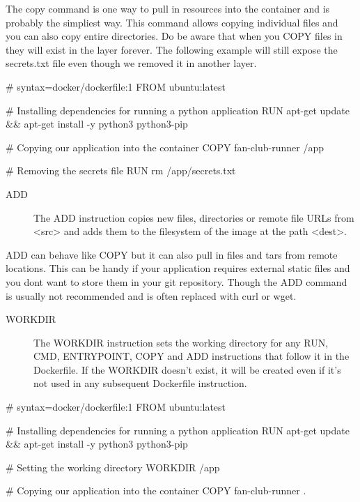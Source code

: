 \documentclass{csse4400}
\begin{document}
The copy command is one way to pull in resources into the container and is probably the simpliest way. This command allows copying individual files and you can also copy entire directories. Do be aware that when you COPY files in they will exist in the layer forever. The following example will still expose the secrets.txt file even though we removed it in another layer.

\begin{code}[language=docker,numbers=none]{}
  # syntax=docker/dockerfile:1
  FROM ubuntu:latest

  # Installing dependencies for running a python application
  RUN apt-get update && apt-get install -y python3 python3-pip

  # Copying our application into the container
  COPY fan-club-runner /app

  # Removing the secrets file
  RUN rm /app/secrets.txt
\end{code}

\begin{description}
  \item[ADD] The ADD instruction copies new files, directories or remote file URLs from <src> and adds them to the filesystem of the image at the path <dest>. \cite{Dockerfile}
\end{description}

ADD can behave like COPY but it can also pull in files and tars from remote locations. This can be handy if your application requires external static files and you dont want to store them in your git repository. Though the ADD command is usually not recommended and is often replaced with curl or wget.

\begin{description}
  \item[WORKDIR] The WORKDIR instruction sets the working directory for any RUN, CMD, ENTRYPOINT, COPY and ADD instructions that follow it in the Dockerfile. If the WORKDIR doesn't exist, it will be created even if it's not used in any subsequent Dockerfile instruction. \cite{Dockerfile}
\end{description}

\begin{code}[language=docker,numbers=none]{}
  # syntax=docker/dockerfile:1
  FROM ubuntu:latest

  # Installing dependencies for running a python application
  RUN apt-get update && apt-get install -y python3 python3-pip

  # Setting the working directory
  WORKDIR /app

  # Copying our application into the container
  COPY fan-club-runner .
\end{code}
\end{document}
